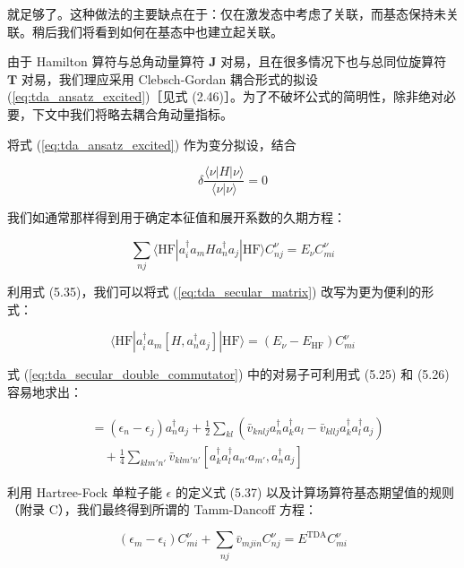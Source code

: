 就足够了。这种做法的主要缺点在于：仅在激发态中考虑了关联，而基态保持未关联。稍后我们将看到如何在基态中也建立起关联。

由于 Hamilton 算符与总角动量算符 $\boldsymbol{J}$ 对易，且在很多情况下也与总同位旋算符 $\boldsymbol{T}$
对易，我们理应采用 Clebsch-Gordan 耦合形式的拟设 (\ref{eq:tda_ansatz_excited})［见式
(2.46)］。为了不破坏公式的简明性，除非绝对必要，下文中我们将略去耦合角动量指标。

将式 (\ref{eq:tda_ansatz_excited}) 作为变分拟设，结合

\begin{equation}
\delta\frac{\langle\nu|H|\nu\rangle}{\langle\nu|\nu\rangle}=0\label{eq:tda_variational_principle}
\end{equation}

我们如通常那样得到用于确定本征值和展开系数的久期方程：

\begin{equation}
\sum_{nj}\langle\text{HF}|a^{\dagger}_{i}a_{m}Ha^{\dagger}_{n}a_{j}|\text{HF}\rangle C^{\nu}_{nj}=E_{\nu}C^{\nu}_{mi}\label{eq:tda_secular_matrix}
\end{equation}

利用式 (5.35)，我们可以将式 (\ref{eq:tda_secular_matrix}) 改写为更为便利的形式：

\begin{equation}
\langle\text{HF}|a^{\dagger}_{i}a_{m}[H,a^{\dagger}_{n}a_{j}]|\text{HF}\rangle=(E_{\nu}-E_{\text{HF}})C^{\nu}_{mi}\label{eq:tda_secular_double_commutator}
\end{equation}

式 (\ref{eq:tda_secular_double_commutator}) 中的对易子可利用式 (5.25) 和 (5.26)
容易地求出：

\begin{align}
[H,a^{\dagger}_{n}a_{j}] & =(\epsilon_{n}-\epsilon_{j})a^{\dagger}_{n}a_{j}+\frac{1}{2}\sum_{kl}\left(\bar{v}_{knlj}a^{\dagger}_{n}a^{\dagger}_{k}a_{l}-\bar{v}_{kllj}a^{\dagger}_{k}a^{\dagger}_{l}a_{j}\right)\nonumber \\
 & \quad+\frac{1}{4}\sum_{klm'n'}\bar{v}_{klm'n'}[a^{\dagger}_{k}a^{\dagger}_{l}a_{n'}a_{m'},a^{\dagger}_{n}a_{j}]\label{eq:tda_commutator_h_ph}
\end{align}

利用 Hartree-Fock 单粒子能 $\epsilon$ 的定义式 (5.37) 以及计算场算符基态期望值的规则（附录 C），我们最终得到所谓的
Tamm-Dancoff 方程：

\begin{equation}
(\epsilon_{m}-\epsilon_{i})C^{\nu}_{mi}+\sum_{nj}\bar{v}_{mjin}C^{\nu}_{nj}=E^{\text{TDA}}C^{\nu}_{mi}\label{eq:tda_secular_equation}
\end{equation}

